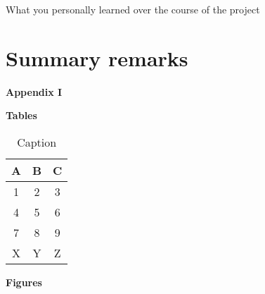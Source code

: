 \documentclass[11pt,a4paper]{article} \usepackage[lmargin=1in,rmargin=1in,tmargin=1in,bmargin=1in]{geometry} \usepackage[pagewise]{lineno} %
\begin{document}
What you personally learned over the course of the project

\newpage

\section{Summary remarks} \label{summary-remarks}

%
%

\newpage

\noindent\Large{\textbf{Appendix I}} \label{appendix-i}

\newpage

\noindent\textbf{\Large{Tables}}

\begin{table}[h!]
    \centering
    \caption{Caption}
    \label{tab-label}
    \begin{tabular}{|c|c|c|}
        \hline
        A&
        B&
        C\\
        \hline
        1&2&3\\
        \hline
        4&5&6\\
        \hline
        7&8&9\\
        \hline
        X&Y&Z\\
        \hline
    \end{tabular}
\end{table}

\newpage

\noindent\textbf{\Large{Figures}}

\end{document}
